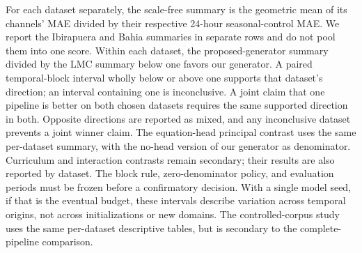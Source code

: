 For each dataset separately, the scale-free summary is the geometric mean
of its channels' MAE divided by their respective 24-hour seasonal-control
MAE. We report the Ibirapuera and Bahia summaries in separate rows and do
not pool them into one score. Within each dataset, the proposed-generator
summary divided by the LMC summary below one favors our generator. A paired
temporal-block interval wholly below or above one supports that dataset's
direction; an interval containing one is inconclusive. A joint claim that
one pipeline is better on both chosen datasets requires the same supported
direction in both. Opposite directions are reported as mixed, and any
inconclusive dataset prevents a joint winner claim. The equation-head
principal contrast uses the same per-dataset summary, with the no-head
version of our generator as denominator. Curriculum and interaction
contrasts remain secondary; their results are also reported by dataset.
The block rule, zero-denominator policy, and evaluation periods must be
frozen before a confirmatory decision. With a single model seed, if that is
the eventual budget, these intervals describe variation across temporal
origins, not across initializations or new domains. The controlled-corpus
study uses the same per-dataset descriptive tables, but is secondary to
the complete-pipeline comparison.
